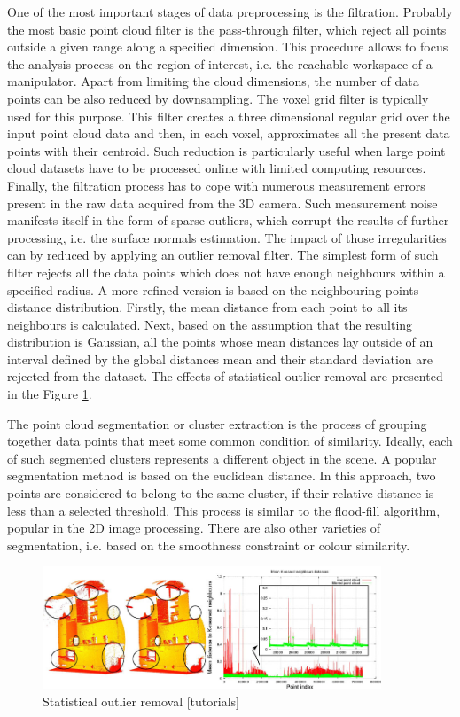 
 One of the most important stages of data preprocessing is the filtration. Probably the most basic point cloud filter is the pass-through filter, which reject all points outside a given range along a specified dimension. This procedure allows to focus the analysis process on the region of interest, i.e. the reachable workspace of a manipulator. Apart from limiting the cloud dimensions, the number of data points can be also reduced by downsampling. The voxel grid filter is typically used for this purpose. This filter creates a three dimensional regular grid over the input point cloud data and then, in each voxel, approximates all the present data points with their centroid. Such reduction is particularly useful when large point cloud datasets have to be processed online with limited computing resources. Finally, the filtration process has to cope with numerous measurement errors present in the raw data acquired from the 3D camera. Such measurement noise 
manifests itself in the form of sparse outliers, which corrupt the results of further processing, i.e. the surface normals estimation. The impact of those irregularities can by reduced by applying an outlier removal filter. The simplest form of such filter rejects all the data points which does not have enough neighbours within a specified radius. A more refined version is based on the neighbouring points distance distribution. Firstly, the mean distance from each point to all its neighbours is calculated. Next, based on the assumption that the resulting distribution is Gaussian, all the points whose mean distances lay outside of an interval defined by the global distances mean and their standard deviation are rejected from the dataset. The effects of statistical outlier removal are presented in the Figure \ref{fig:outlierremoval}.

The point cloud segmentation or cluster extraction is the process of grouping together data points that meet some common condition of similarity. Ideally, each of such segmented clusters represents a different object in the scene. A popular segmentation method is based on the euclidean distance. In this approach, two points are considered to belong to the same cluster, if their relative distance is less than a selected threshold. This process is similar to the flood-fill algorithm, popular in the 2D image processing. There are also other varieties of segmentation, i.e. based on the smoothness constraint or colour similarity.

\begin{figure}[H]
\centering
\includegraphics[width=0.9\textwidth]{fig/statistical_removal}
\caption{Statistical outlier removal [tutorials]}
\label{fig:outlierremoval}
\end{figure}


